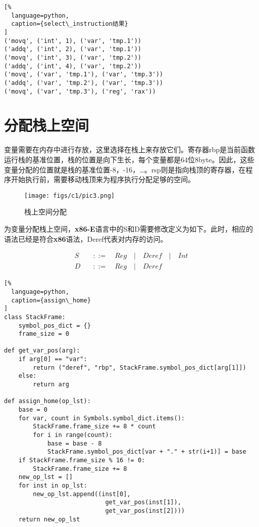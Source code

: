 \begin{lstlisting}[%
  language=python,
  caption={select\_instruction结果}
]
('movq', ('int', 1), ('var', 'tmp.1'))
('addq', ('int', 2), ('var', 'tmp.1'))
('movq', ('int', 3), ('var', 'tmp.2'))
('addq', ('int', 4), ('var', 'tmp.2'))
('movq', ('var', 'tmp.1'), ('var', 'tmp.3'))
('addq', ('var', 'tmp.2'), ('var', 'tmp.3'))
('movq', ('var', 'tmp.3'), ('reg', 'rax'))
\end{lstlisting}

\section{分配栈上空间}

变量需要在内存中进行存放，这里选择在栈上来存放它们。寄存器rbp是当前函数运行栈的基准位置，栈的位置是向下生长，每个变量都是64位8byte。因此，这些变量分配的位置就是栈的基准位置-8，-16，…。rsp则是指向栈顶的寄存器，在程序开始执行前，需要移动栈顶来为程序执行分配足够的空间。

\begin{figure}[ht]
\centering
\texttt{[image: figs/c1/pic3.png]}
\caption{栈上空间分配}
\label{fig:fig3}
\end{figure}

为变量分配栈上空间，\textbf{x86-E}语言中的S和D需要修改定义为如下。此时，相应的语法已经是符合\textbf{x86}语法，Deref代表对内存的访问。

\begin{equation}
\begin{aligned}
  \label{eq:5}
   S \quad &::= \quad Reg \quad | \quad Deref \quad | \quad Int \\
   D \quad &::=  \quad Reg \quad | \quad Deref 
\end{aligned}
\end{equation}

\begin{lstlisting}[%
  language=python,
  caption={assign\_home}
]
class StackFrame:
    symbol_pos_dict = {}
    frame_size = 0

def get_var_pos(arg):
    if arg[0] == "var":
        return ("deref", "rbp", StackFrame.symbol_pos_dict[arg[1]])
    else:
        return arg

def assign_home(op_lst):
    base = 0
    for var, count in Symbols.symbol_dict.items():
        StackFrame.frame_size += 8 * count
        for i in range(count):
            base = base - 8
            StackFrame.symbol_pos_dict[var + "." + str(i+1)] = base
    if StackFrame.frame_size % 16 != 0:
        StackFrame.frame_size += 8
    new_op_lst = []
    for inst in op_lst:
        new_op_lst.append((inst[0], 
                            get_var_pos(inst[1]), 
                            get_var_pos(inst[2])))
    return new_op_lst
\end{lstlisting}

